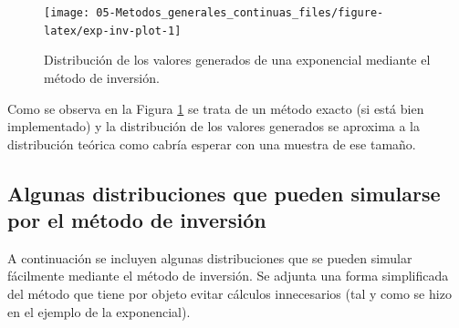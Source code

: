 \documentclass[
]{book}
\theoremstyle{break}
\theoremstyle{definition}
\theoremstyle{definition}
\theoremstyle{definition}
\theoremstyle{remark}
\begin{document}
\begin{figure}[!htb]

{\centering \texttt{[image: 05-Metodos\_generales\_continuas\_files/figure-latex/exp-inv-plot-1]} 

}

\caption{Distribución de los valores generados de una exponencial mediante el método de inversión.}\label{fig:exp-inv-plot}
\end{figure}

Como se observa en la Figura \ref{fig:exp-inv-plot} se trata de un método exacto (si está bien implementado) y la distribución de los valores generados se aproxima a la distribución teórica como cabría esperar con una muestra de ese tamaño.

\hypertarget{algunas-distribuciones-que-pueden-simularse-por-el-muxe9todo-de-inversiuxf3n}{%
\subsection{Algunas distribuciones que pueden simularse por el método de inversión}\label{algunas-distribuciones-que-pueden-simularse-por-el-muxe9todo-de-inversiuxf3n}}

A continuación se incluyen algunas distribuciones que se pueden simular
fácilmente mediante el método de inversión. Se adjunta una forma
simplificada del método que tiene por objeto evitar cálculos
innecesarios (tal y como se hizo en el ejemplo de la exponencial).
\end{document}
